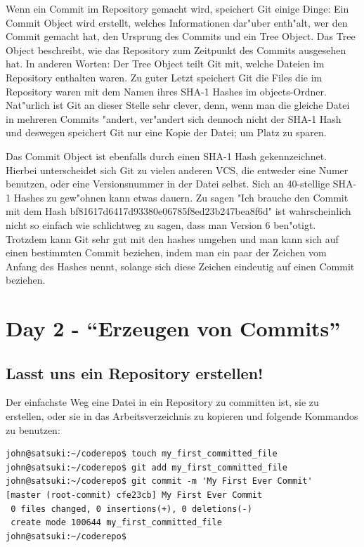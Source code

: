 Wenn ein Commit im Repository gemacht wird, speichert Git einige Dinge: Ein Commit Object wird erstellt, welches Informationen dar"uber enth"alt, wer den Commit gemacht hat, den Ursprung des Commits und ein Tree Object. Das Tree Object beschreibt, wie das Repository zum Zeitpunkt des Commits ausgesehen hat. In anderen Worten: Der Tree Object teilt Git mit, welche Dateien im Repository enthalten waren. Zu guter Letzt speichert Git die Files die im Repository waren mit dem Namen ihres SHA-1 Hashes im objects-Ordner. Nat"urlich ist Git an dieser Stelle sehr clever, denn, wenn man die gleiche Datei in mehreren Commits "andert, ver"andert sich dennoch nicht der SHA-1 Hash und deswegen speichert Git nur eine Kopie der Datei; um Platz zu sparen. 

Das Commit Object ist ebenfalls durch einen SHA-1 Hash gekennzeichnet. Hierbei unterscheidet sich Git zu vielen anderen VCS, die entweder eine Numer benutzen, oder eine Versionsnummer in der Datei selbst. Sich an 40-stellige SHA-1 Hashes zu gew"ohnen kann etwas dauern. Zu sagen "Ich brauche den Commit mit dem Hash bf81617d6417d93380e06785f8ed23b247bea8f6d" ist wahrscheinlich nicht so einfach wie schlichtweg zu sagen, dass man Version 6 ben"otigt. Trotzdem kann Git sehr gut mit den hashes umgehen und man kann sich auf einen bestimmten Commit beziehen, indem man ein paar der Zeichen vom Anfang des Hashes nennt, solange sich diese Zeichen eindeutig auf einen Commit beziehen.

\section{Day 2 - ``Erzeugen von Commits''}
\subsection{Lasst uns ein Repository erstellen!}

Der einfachste Weg eine Datei in ein Repository zu committen ist, sie zu erstellen, oder sie in das Arbeitsverzeichnis zu kopieren und folgende Kommandos zu benutzen:

\begin{Verbatim}
john@satsuki:~/coderepo$ touch my_first_committed_file
john@satsuki:~/coderepo$ git add my_first_committed_file
john@satsuki:~/coderepo$ git commit -m 'My First Ever Commit'
[master (root-commit) cfe23cb] My First Ever Commit
 0 files changed, 0 insertions(+), 0 deletions(-)
 create mode 100644 my_first_committed_file
john@satsuki:~/coderepo$ 
\end{Verbatim} 

